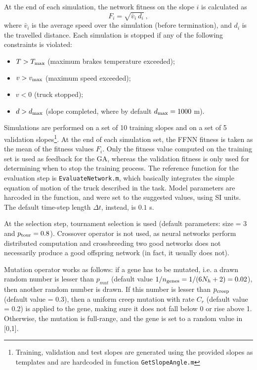 \documentclass[12pt,titlepage]{article}
\begin{document}
At the end of each simulation, the network fitness on the slope $i$ is calculated as
\[
F_i = \sqrt{\bar{v}_i \ d_i } \ ,
\]
where $\bar{v}_i$ is the average speed over the simulation (before termination), and $d_i$ is the travelled distance. Each simulation is stopped if any of the following constraints is violated:
\begin{itemize} \itemsep0em
\item $T > T_{\textup{max}}$ (maximum brakes temperature exceeded);
\item $v > v_{\textup{max}}$ (maximum speed exceeded);
\item $v < 0$ (truck stopped);
\item $d > d_{\textup{max}}$ (slope completed, where by default $d_{\textup{max}} = 1000$ m).
\end{itemize}
Simulations are performed on a set of 10 training slopes and on a set of 5 validation slopes\footnote{Training, validation and test slopes are generated using the provided slopes as templates and are hardcoded in function \texttt{GetSlopeAngle.m}}. At the end of each simulation set, the FFNN fitness is taken as 
the mean of the fitness values $F_i$. Only the fitness value computed on the training set is used as feedback for the GA, whereas the validation fitness is only used for determining when to stop the training process. The reference function for the evaluation step is \texttt{EvaluateNetwork.m}, which basically integrates the simple equation of motion of the truck described in the task. Model parameters are harcoded in the function, and were set to the suggested values, using SI units. The default time-step length $\Delta t$, instead, is $0.1$ s.

At the selection step, tournament selection is used (default parameters: size = 3 and ${p_{\textup{tour}} = 0.8}$). Crossover operator is not used, as neural networks perform distributed computation and crossbreeding two good networks does not necessarily produce a good offspring network (in fact, it usually does not).

Mutation operator works as follows: if a gene has to be mutated, i.e. a drawn random number is lesser than $p_{mut} $ (default value ${1/n_{\textup{genes}}} = {1/(6 N_h + 2) = 0.02}$), then another random number is drawn. If this number is lesser than $p_{\textup{creep}}$ (default value = 0.3), then a uniform creep mutation with rate $C_r$ (default value = 0.2) is applied to the gene, making sure it does not fall below 0 or rise above 1. Otherwise, the mutation is full-range, and the gene is set to a random value in [0,1].
\end{document}
